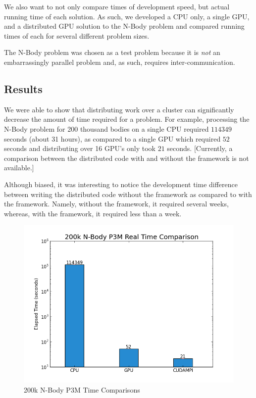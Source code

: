 \documentclass{acm_proc_article-sp}
\begin{document}
We also want to not only compare times of development speed, but actual running
time of each solution. As such, we developed a CPU only, a single GPU, and a
distributed GPU solution to the N-Body problem and compared running times of
each for several different problem sizes.

The N-Body problem was chosen as a test problem because it is \emph{not} an
embarrassingly parallel problem and, as such, requires inter-communication.

\subsection{Results}

We were able to show that distributing work over a cluster can significantly
decrease the amount of time required for a problem. For example, processing the
N-Body problem for 200 thousand bodies on a single CPU required $114349$
seconds (about 31 hours), as compared to a single GPU which required $52$
seconds and distributing over 16 GPU's only took $21$ seconds. [Currently, a
comparison between the distributed code with and without the framework is not
available.]

Although biased, it was interesting to notice the development time difference
between writing the distributed code without the framework as compared to with
the framework. Namely, without the framework, it required several weeks,
whereas, with the framework, it required less than a week.

\begin{figure}
\includegraphics[scale=0.4]{200k_bar_chart.png}
\caption{200k N-Body P3M Time Comparisons}
\end{figure}
\end{document}

